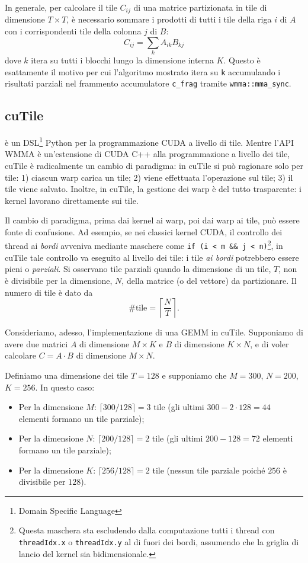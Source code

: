\begin{warning}{}
    In generale, per calcolare il tile \(C_{ij}\) di una matrice partizionata in tile di dimensione \(T \times T\), è necessario sommare i prodotti di tutti i tile della riga \(i\) di \(A\) con i corrispondenti tile della colonna \(j\) di \(B\):
    \[
    C_{ij} = \sum_{k} A_{ik} B_{kj}
    \]
    dove \(k\) itera su tutti i blocchi lungo la dimensione interna \(K\). Questo è esattamente il motivo per cui l'algoritmo mostrato itera su \texttt{k} accumulando i risultati parziali nel frammento accumulatore \texttt{c\_frag} tramite \texttt{wmma::mma\_sync}.
\end{warning}

\subsection{cuTile}
 è un DSL\footnote{Domain Specific Language} Python per la programmazione CUDA a livello di tile.
Mentre l'API WMMA è un'estensione di CUDA C++ alla programmazione a livello dei tile, cuTile è radicalmente un cambio di paradigma: in cuTile si può ragionare solo per tile: 1) ciascun warp carica un tile; 2) viene effettuata l'operazione sul tile; 3) il tile viene salvato. 
Inoltre, in cuTile, la gestione dei warp è del tutto trasparente: i kernel lavorano direttamente sui tile.

Il cambio di paradigma, prima dai kernel ai warp, poi dai warp ai tile, può essere fonte di confusione.
Ad esempio, se nei classici kernel CUDA, il controllo dei thread ai \emph{bordi} avveniva mediante maschere come \texttt{if (i < m \&\& j < n)}\footnote{Questa maschera sta escludendo dalla computazione tutti i thread con \texttt{threadIdx.x} o \texttt{threadIdx.y} al di fuori dei bordi, assumendo che la griglia di lancio del kernel sia bidimensionale.}, in cuTile tale controllo va eseguito al livello dei tile: i tile \emph{ai bordi} potrebbero essere pieni o \emph{parziali}.
Si osservano tile parziali quando la dimensione di un tile, \(T\), non è divisibile per la dimensione, \(N\), della matrice (o del vettore) da partizionare.
Il numero di tile è dato da
\[ \#\text{tile} = \left\lceil\frac{N}{T}\right\rceil. \]

\noindent
Consideriamo, adesso, l'implementazione di una GEMM in cuTile. 
Supponiamo di avere due matrici \(A\) di dimensione \(M \times K\) e \(B\) di dimensione \(K \times N\), e di voler calcolare \(C = A \cdot B\) di dimensione \(M \times N\). 

Definiamo una dimensione dei tile \(T = 128\) e supponiamo che \(M = 300\), \(N = 200\), \(K = 256\). In questo caso:
\begin{itemize}
    \item Per la dimensione \(M\): \(\lceil{300/128}\rceil = 3\) tile (gli ultimi \(300 - 2\cdot128 = 44\) elementi formano un tile parziale);
    \item Per la dimensione \(N\): \(\lceil{200/128}\rceil = 2\) tile (gli ultimi \(200 - 128 = 72\) elementi formano un tile parziale);
    \item Per la dimensione \(K\): \(\lceil{256/128}\rceil = 2\) tile (nessun tile parziale poiché \(256\) è divisibile per \(128\)).
\end{itemize}

